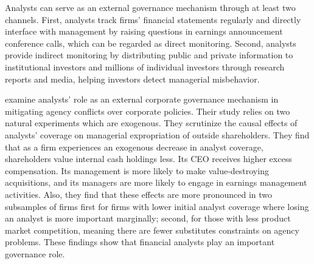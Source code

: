 \documentclass[final,1p,authoryear]{elsarticle}
\begin{document}
Analysts can serve as an external governance mechanism through at least two channels. First, analysts track firms' financial statements regularly and directly interface with management by raising questions in earnings announcement conference calls, which can be regarded as direct monitoring. Second, analysts provide indirect monitoring by distributing public and private information to institutional investors and millions of individual investors through research reports and media, helping investors detect managerial misbehavior.

\cite{RePEc:eee:jfinec:v:115:y:2015:i:2:p:383-410} examine analysts' role as an external corporate governance mechanism in mitigating agency conflicts over corporate policies. Their study relies on two natural experiments which are exogenous. They scrutinize the causal effects of analysts' coverage on managerial expropriation of outside shareholders. They find that as a firm experiences an exogenous decrease in analyst coverage, shareholders value internal cash holdings less. Its CEO receives higher excess compensation. Its management is more likely to make value-destroying acquisitions, and its managers are more likely to engage in earnings management activities. Also, they find that these effects are more pronounced in two subsamples of firms first for firms with lower initial analyst coverage where losing an analyst is more important marginally; second, for those with less product market competition, meaning there are fewer substitutes constraints on agency problems. These findings show that financial analysts play an important governance role.






  














\end{document}
